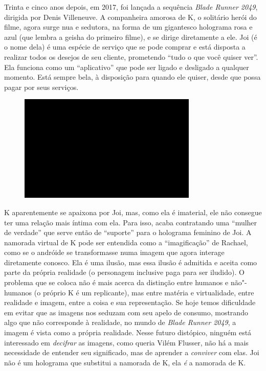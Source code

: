 Trinta e cinco anos depois, em 2017, foi lançada a sequência \emph{Blade
Runner 2049}, dirigida por Denis Villeneuve. A companheira amorosa de K,
o solitário herói do filme, agora surge nua e sedutora, na forma de um
gigantesco holograma rosa e azul (que lembra a geisha do primeiro
filme), e se dirige diretamente a ele. Joi (é o nome dela) é uma espécie
de serviço que se pode comprar e está disposta a realizar todos os
desejos de seu cliente, prometendo ``tudo o que você quiser ver''. Ela
funciona como um ``aplicativo'' que pode ser ligado e desligado a
qualquer momento. Está sempre bela, à disposição para quando ele quiser,
desde que possa pagar por seus serviços.

\begin{figure}[!ht]
\centering
 \includegraphics[width=85mm]{./imgs/im1.jpg}
\caption{\tiny{}}
\end{figure}

K aparentemente se apaixona por Joi, mas, como ela é imaterial, ele não
consegue ter uma relação mais íntima com ela. Para isso, acaba
contratando uma ``mulher de verdade'' que serve então de ``suporte''
para o holograma feminino de Joi. A namorada virtual de K pode ser
entendida como a ``imagificação'' de Rachael, como se o andróide se
transformasse numa imagem que agora interage diretamente conosco. Ela é
uma ilusão, mas essa ilusão é admitida e aceita como parte da própria
realidade (o personagem inclusive paga para ser iludido). O problema que
se coloca não é mais acerca da distinção entre humanos e não"-humanos (o
próprio K é um replicante), mas entre matéria e virtualidade, entre
realidade e imagem, entre a coisa e sua representação. Se hoje temos
dificuldade em evitar que as imagens nos seduzam com seu apelo de
consumo, mostrando algo que não corresponde à realidade, no mundo de
\emph{Blade Runner 2049}, a imagem é vista como a própria realidade.
Nesse futuro distópico, ninguém está interessado em \emph{decifrar} as
imagens, como queria Vilém Flusser, não há a mais necessidade de
entender seu significado, mas de aprender a \emph{conviver} com elas.
Joi não é um holograma que substitui a namorada de K, ela \emph{é} a
namorada de K.

